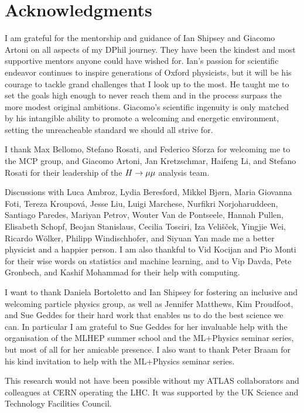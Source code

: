 \chapter*{Acknowledgments}

I am grateful for the mentorship and guidance of Ian Shipsey and Giacomo Artoni
on all aspects of my DPhil journey. They have been the kindest and most
supportive mentors anyone could have wished for. Ian's passion for
scientific endeavor continues to inspire generations of Oxford physicists, but
it will be his courage to tackle grand challenges that I look up to the most. He
taught me to set the goals high enough to never reach them and in the process
surpass the more modest original ambitions. Giacomo's scientific ingenuity is
only matched by his intangible ability to promote a welcoming and energetic
environment, setting the unreacheable standard we should all strive for.

I thank Max Bellomo, Stefano Rosati, and Federico Sforza for welcoming me to the MCP
group, and Giacomo Artoni, Jan Kretzschmar, Haifeng Li, and Stefano Rosati
for their leadership of the $H \rightarrow \mu\mu$ analysis team.

Discussions with Luca Ambroz, Lydia Beresford, Mikkel Bj{\o}rn, Maria Giovanna Foti,
Tereza Kroupov\'a, Jesse Liu, Luigi Marchese,
Nurfikri Norjoharuddeen, Santiago Paredes, Mariyan Petrov, Wouter Van de Pontseele,
Hannah Pullen, Elisabeth Schopf, Beojan Stanislaus, Cecilia Tosciri,
Iza Veli\v{s}\v{c}ek, Yingjie Wei, Ricardo W\"olker, Philipp Windischhofer,
and Siyuan Yan made me a better physicist
and a happier person. I am also thankful to Vid Kocijan and Pio Monti for their wise
words on statistics and machine learning, and to Vip Davda, Pete Gronbech, and
Kashif Mohammad for their help with computing.

I want to thank Daniela Bortoletto and Ian Shipsey for fostering an inclusive
and welcoming particle physics group, as well as Jennifer Matthews, Kim Proudfoot,
and Sue Geddes for their hard work that enables us to do the best science we can.
In particular I am grateful to Sue Geddes for her invaluable help with the
organisation of the MLHEP summer school and the ML+Physics seminar series,
but most of all for her amicable presence. I also want to thank Peter Braam for his kind
invitation to help with the ML+Physics seminar series.

This research would not have been possible without my ATLAS collaborators
and colleagues at CERN operating the LHC. It was supported by the UK Science and
Technology Facilities Council.

\thispagestyle{empty}
